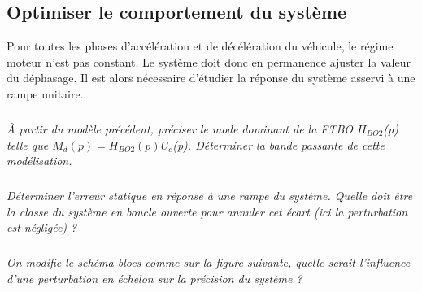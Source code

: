 \documentclass[10pt,fleqn]{article} %
\begin{document}
\begin{multicols}{2}



\section*{Optimiser le comportement du système}

Pour toutes les phases d'accélération et de décélération du véhicule, le régime moteur n'est pas constant. Le système doit donc en permanence ajuster la valeur du déphasage. Il est alors nécessaire d'étudier la réponse du système asservi à une rampe unitaire.


\subparagraph{}\textit{ À partir du modèle précédent, préciser le mode dominant de la FTBO $H_{BO2}$(p) telle que $M_{d}(p) = H_{BO2}(p)U_{c}$(p). Déterminer la bande passante de cette modélisation. }

\subparagraph{}\textit{ Déterminer l'erreur statique en réponse à une rampe du système. Quelle doit être la classe du système en boucle ouverte pour annuler cet écart (ici la perturbation est négligée) ?}

\subparagraph{}\textit{On modifie le schéma-blocs comme sur la figure suivante,%
quelle serait l'influence d'une perturbation en échelon sur la précision du système ?}




\end{multicols}
\end{document}
